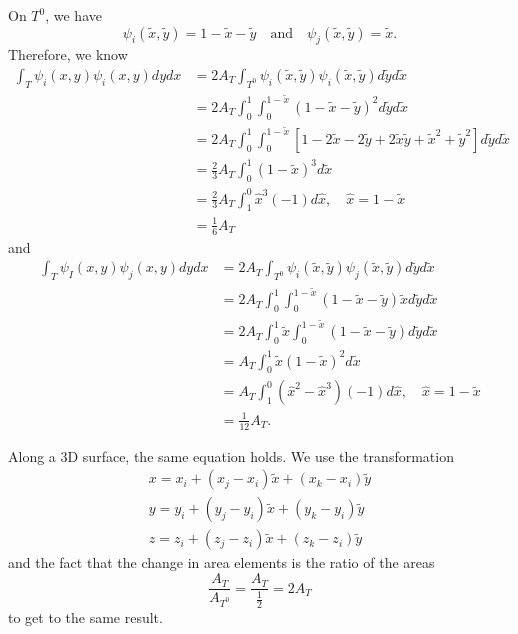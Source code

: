 On $T^0$, we have
\[
    \psi_i (\tilde{x}, \tilde{y}) = 1 - \tilde{x} - \tilde{y} \quad \text{and} \quad \psi_j (\tilde{x}, \tilde{y}) = \tilde{x}.
\]
Therefore, we know
\begin{align*}
    \int_T \psi_i(x, y) \psi_i(x, y) dydx &= 2 A_T \int_{T^0} \psi_i(\tilde{x}, \tilde{y}) \psi_i(\tilde{x}, \tilde{y}) d\tilde{y}d\tilde{x} \\
    &= 2 A_T \int_0^1 \int_0^{1 - \tilde{x}} (1 - \tilde{x} - \tilde{y})^2 d\tilde{y}d\tilde{x} \\
    &= 2 A_T \int_0^1 \int_0^{1 - \tilde{x}} \left[ 1 - 2 \tilde{x} - 2 \tilde{y} + 2 \tilde{x} \tilde{y} + \tilde{x}^2 + \tilde{y}^2 \right] d\tilde{y}d\tilde{x} \\
    &= \frac{2}{3} A_T \int_0^1 (1 - \tilde{x})^3 d\tilde{x} \\
    &= \frac{2}{3} A_T \int_1^0 \hat{x}^3 (-1) d\hat{x}, \quad \hat{x} = 1 - \tilde{x} \\
    &= \frac{1}{6} A_T
\end{align*}
and
\begin{align*}
    \int_T \psi_I(x, y) \psi_j(x, y) dydx &= 2 A_T \int_{T^0} \psi_i(\tilde{x}, \tilde{y}) \psi_j(\tilde{x}, \tilde{y}) d\tilde{y}d\tilde{x} \\
    &= 2 A_T \int_0^1 \int_0^{1 - \tilde{x}} (1 - \tilde{x} - \tilde{y}) \tilde{x} d\tilde{y}d\tilde{x} \\
    &= 2 A_T \int_0^1 \tilde{x} \int_0^{1 - \tilde{x}} (1 - \tilde{x} - \tilde{y}) d\tilde{y}d\tilde{x} \\
    &= A_T \int_0^1 \tilde{x} (1 - \tilde{x})^2 d\tilde{x} \\
    &= A_T \int_1^0 (\hat{x}^2 - \hat{x}^3) (-1) d \hat{x}, \quad \hat{x} = 1 - \tilde{x} \\
    &= \frac{1}{12} A_T.
\end{align*}

Along a 3D surface, the same equation holds. We use the transformation
\begin{align*}
    x = x_i + (x_j - x_i) \tilde{x} + (x_k - x_i) \tilde{y} \\
    y = y_i + (y_j - y_i) \tilde{x} + (y_k - y_i) \tilde{y} \\
    z = z_i + (z_j - z_i) \tilde{x} + (z_k - z_i) \tilde{y}
\end{align*}
and the fact that the change in area elements is the ratio of the areas
\[
    \frac{A_T}{A_{T^0}} = \frac{A_T}{\frac{1}{2}} = 2 A_T
\]
to get to the same result.



